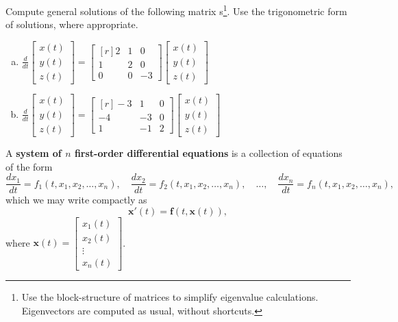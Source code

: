       \begin{question}
        Compute general solutions of the following matrix \ode{}s\footnote{Use the block-structure of matrices to simplify eigenvalue calculations. Eigenvectors are computed as usual, without shortcuts.}. Use the trigonometric form of solutions, where appropriate.
        \begin{enumerate}[(a)]
        \item \(
          \frac{d}{dt}
          \begin{bmatrix*}
            x(t) \\ y(t) \\ z(t)
          \end{bmatrix*} =
          \begin{bmatrix*}[r]
            2 & 1 & 0\\ 1 & 2 & 0 \\ 0 & 0 & -3
          \end{bmatrix*}
          \begin{bmatrix*}
            x(t) \\ y(t) \\ z(t)
          \end{bmatrix*}
          \)
          \solspace{4in}

        \newpage\item \(
          \frac{d}{dt}
          \begin{bmatrix*}
            x(t) \\ y(t) \\ z(t)
          \end{bmatrix*} =
          \begin{bmatrix*}[r]
            -3 & 1 & 0\\ -4 & -3 & 0 \\ 1 & -1 & 2
          \end{bmatrix*}
          \begin{bmatrix*}
            x(t) \\ y(t) \\ z(t)
          \end{bmatrix*}
          \)
          \solspace{4in}
        \end{enumerate}
      \end{question}


    \begin{definition}
      A \textbf{system of $n$ first-order differential equations} is a collection of equations of the form
      \[
      \frac{dx_1}{dt} = f_1(t, x_1, x_2, \dots, x_n),
      \quad
      \frac{dx_2}{dt} = f_2(t, x_1, x_2, \dots, x_n),
      \quad \dots,
      \quad
      \frac{dx_n}{dt} = f_n(t, x_1, x_2, \dots, x_n),
      \]
      which we may write compactly as
      \[
      \mathbf{x}'(t) = \mathbf{f}(t, \mathbf{x}(t)),
      \]
      where $\mathbf{x}(t) = \begin{bmatrix} x_1(t) \\ x_2(t) \\ \vdots \\ x_n(t) \end{bmatrix}$.
    \end{definition}

